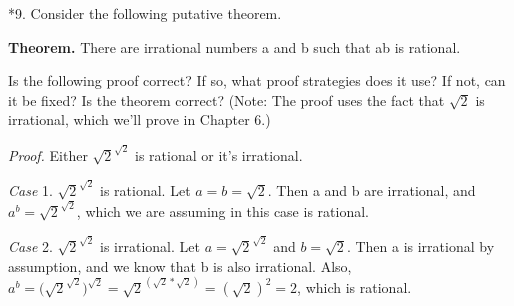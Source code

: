 \documentclass{article}
\begin{document}
*9. Consider the following putative theorem.

\textbf{Theorem.} There are irrational numbers a and b such that ab is rational.

Is the following proof correct? If so, what proof strategies does it use?
If not, can it be fixed? Is the theorem correct? (Note: The proof uses the
fact that $\sqrt{2}$ is irrational, which we'll prove in Chapter 6.)

\textit{Proof.} Either $\sqrt{2}^{\sqrt{2}}$ is rational or it's irrational.

\textit{Case} 1. $\sqrt{2}^{\sqrt{2}}$ is rational. Let $a = b = \sqrt{2}$. Then a and b are irrational,
and $a^b = \sqrt{2}^{\sqrt{2}}$, which we are assuming in this case is rational.

\textit{Case} 2. $\sqrt{2}^{\sqrt{2}}$ is irrational. Let $a = \sqrt{2}^{\sqrt{2}}$ and $b = \sqrt{2}$. Then a is
irrational by assumption, and we know that b is also irrational. Also,
$a^b = \big(\sqrt{2}^{\sqrt{2}}\big)^{\sqrt{2}} = \sqrt{2}^{(\sqrt{2}*\sqrt{2})} = (\sqrt{2})^2 = 2$, which is rational.
\end{document}

